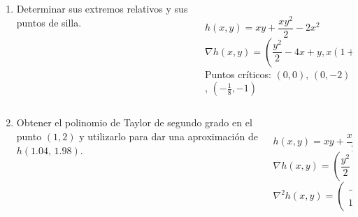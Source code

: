 \documentclass[aspectratio=149,10pt,xcolor=dvipsnames,t]{beamer}
\begin{document}
\begin{frame}
\begin{columns}
\begin{column}[T]{0.55\textwidth}
\begin{enumerate}
\item Determinar sus extremos relativos y sus puntos de silla.
\end{enumerate}
\end{column}
\begin{column}[T]{0.47\textwidth}
\\
$h(x,y) = xy+\dfrac{xy^2}{2}-2x^2$\\
$\nabla h(x,y)=\left(\dfrac{y^2}{2}-4x+y, x(1+y)\right)$\\
Puntos críticos: $(0,0)$, $(0,-2)$, $(-\frac{1}{8},-1)$
\end{column}
\end{columns}
\end{frame}


\begin{frame}
\begin{columns}
\begin{column}[T]{0.57\textwidth}
\begin{enumerate}
\setcounter{enumi}{1}
\item Obtener el polinomio de Taylor de segundo grado en el punto $(1,2)$ y utilizarlo para dar una aproximación de $h(1.04,\,1.98)$.
\end{enumerate}
\end{column}
\begin{column}[T]{0.43\textwidth}
\\
$h(x,y) = xy+\dfrac{xy^2}{2}-2x^2$\\
$\nabla h(x,y)=\left(\dfrac{y^2}{2}-4x+y, x(1+y)\right)$\\
$\nabla^2 h(x,y)=\left(
\begin{array}{cc}
-4 & 1+y\\
1+y & x
\end{array}
\right)$
\end{column}
\end{columns}
\end{frame}
\end{document}
